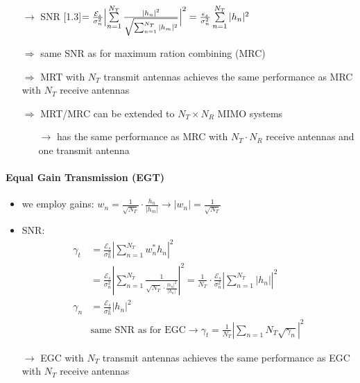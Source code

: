 \documentclass[a4paper, 10pt]{article}
\begin{document}
\begin{itemize}
\begin{itemize}
		\end{itemize}
		\item[$\rightarrow$] SNR \scalebox{1.3}[1.3]{$ = \frac{\mathcal{E}_s}{\sigma _n^2}\Bigl | \sum\limits_{n = 1}^{N_T}\frac{|h_n|^2}{\sqrt{\sum_{n = 1}^{N_T}|h_m|^2}}\Bigr |^2 = \frac{\epsilon _s}{\sigma _n^2}\sum\limits_{n = 1}^{N_T}|h_n|^2 $}
		\item[$\Rightarrow$] same SNR as for maximum ration combining (MRC)
		\item[$\Rightarrow$] MRT with $N_T$ transmit antennas achieves the same performance as MRC with $N_T$ receive antennas
		\item[$\Rightarrow$] MRT/MRC can be extended to $ N_T\times N_R $ MIMO systems
		\begin{itemize}
			\item[$\rightarrow$] has the same performance as MRC with $N_T\cdot N_R$ receive antennas and one transmit antenna
		\end{itemize}
	\end{itemize}
\paragraph{Equal Gain Transmission (EGT)}
\begin{itemize}
	\item we employ gains: $w_n = \frac{1}{\sqrt{N_T}}\cdot \frac{h_n}{|h_m|} \rightarrow |w_n| = \frac{1}{\sqrt{N_T}} $
	\item SNR:
	\begin{align*}
		\gamma _t &= \frac{\mathcal{E}_s}{\sigma _n^2}\left|\sum_{n = 1}^{N_T} w_n^*h_n \right |^2\\
		&= \frac{\mathcal{E}_s}{\sigma _n^2}\left|\sum_{n = 1}^{N_T}\frac{1}{\sqrt{N_T}\cdot \frac{|h_n|^2}{|h_n|}} \right|^2 = \frac{1}{N_T}\cdot \frac{\mathcal{E}_s}{\sigma _n^2} \left|\sum_{n = 1}^{N_T}|h_n| \right|^2\\
		\gamma _n &= \frac{\mathcal{E}_s}{\sigma _n^2}|h_n|^2\\
		&\text{same SNR as for EGC} \rightarrow \gamma _t = \frac{1}{N_T} \left| \sum_{n = 1}{N_T}\sqrt{\gamma _n} \right|^2
	\end{align*}
	\item[$\rightarrow$] EGC with $ N_T$ transmit antennas achieves the same performance as EGC with $ N_T$ receive antennas
\end{itemize}
\end{document}
